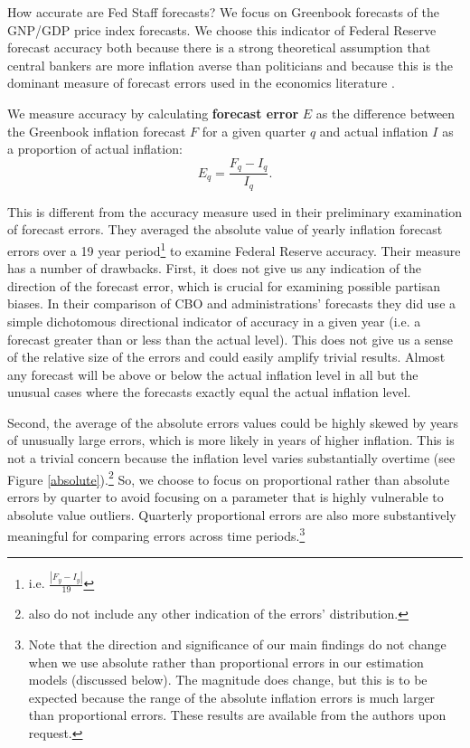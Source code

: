 \documentclass[a4paper]{article}\usepackage{graphicx, color}
\begin{document}
How accurate are Fed Staff forecasts? We focus on Greenbook forecasts of the GNP/GDP price index forecasts. We choose this indicator of Federal Reserve forecast accuracy both because there is a strong theoretical assumption that central bankers are more inflation averse than politicians \citep[e.g.][]{Cukierman1992,Mukherjee2008,Tillmann2008} and because this is the dominant measure of forecast errors used in the economics literature \citep[c.f.][]{Romer2000}. 

We measure accuracy by calculating {\bf{forecast error}} $E$ as the difference between the Greenbook inflation forecast $F$ for a given quarter $q$ and actual inflation $I$ as a proportion of actual inflation:
%
\begin{equation}
    E_{q} = \frac{F_{q} - I_{q}}{I_{q}}.
\end{equation}

This is different from the accuracy measure \cite{Frendreis2000} used in their preliminary examination of forecast errors. They averaged the absolute value of yearly inflation forecast errors over a 19 year period\footnote{i.e. $\frac{|F_{y} - I_{y}|}{19}$} to examine Federal Reserve accuracy. Their measure has a number of drawbacks. First, it does not give us any indication of the direction of the forecast error, which is crucial for examining possible partisan biases. In their comparison of CBO and administrations' forecasts they did use a simple dichotomous directional indicator of accuracy in a given year (i.e. a forecast greater than or less than the actual level). This does not give us a sense of the relative size of the errors and could easily amplify trivial results. Almost any forecast will be above or below the actual inflation level in all but the unusual cases where the forecasts exactly equal the actual inflation level. 

Second, the average of the absolute errors values could be highly skewed by years of unusually large errors, which is more likely in years of higher inflation. This is not a trivial concern because the inflation level varies substantially overtime (see Figure \ref{absolute}).\footnote{\cite{Frendreis2000} also do not include any other indication of the errors' distribution.} So, we choose to focus on proportional rather than absolute errors by quarter to avoid focusing on a parameter that is highly vulnerable to absolute value outliers. Quarterly proportional errors are also more substantively meaningful for comparing errors across time periods.\footnote{Note that the direction and significance of our main findings do not change when we use absolute rather than proportional errors in our estimation models (discussed below). The magnitude does change, but this is to be expected because the range of the absolute inflation errors is much larger than proportional errors. These results are available from the authors upon request.} 
\end{document}
